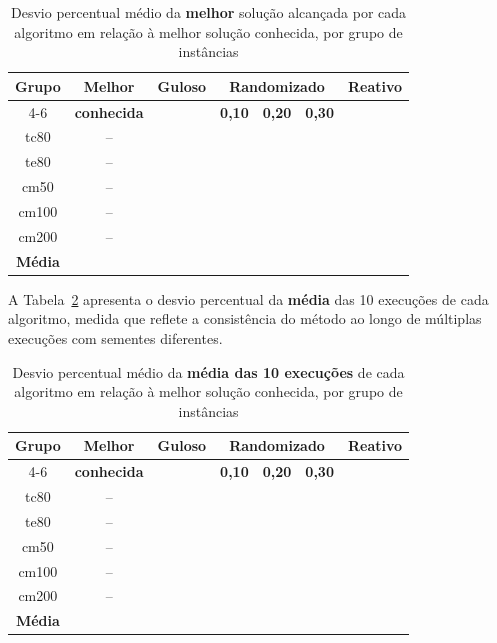 \documentclass[12pt]{article}
\begin{document}
\begin{table}[htbp]
\centering
\caption{Desvio percentual médio da \textbf{melhor} solução alcançada por cada algoritmo em relação à melhor solução conhecida, por grupo de instâncias}
\renewcommand{\arraystretch}{1.2}
{
\footnotesize
\begin{tabular}{|c|c|c|c|c|c|c|}
\hline
\textbf{Grupo} & \textbf{Melhor} & \textbf{Guloso} & \multicolumn{3}{c|}{\textbf{Randomizado}} & \textbf{Reativo} \\ \cline{4-6}
 & \textbf{conhecida} & & \multicolumn{1}{c|}{\textbf{0,10}} & \multicolumn{1}{c|}{\textbf{0,20}} & \multicolumn{1}{c|}{\textbf{0,30}} & \\
\hline
tc80  & -- &  &  &  &  &  \\
te80  & -- &  &  &  &  &  \\
cm50  & -- &  &  &  &  &  \\
cm100 & -- &  &  &  &  &  \\
cm200 & -- &  &  &  &  &  \\
\hline
\textbf{Média} &  &  &  &  &  &  \\
\hline
\end{tabular}
}
\label{tabResultMelhor}
\end{table}

A Tabela~\ref{tabResultMedia} apresenta o desvio percentual da \textbf{média} das 10 execuções de cada algoritmo, medida que reflete a consistência do método ao longo de múltiplas execuções com sementes diferentes.

\begin{table}[htbp]
\centering
\caption{Desvio percentual médio da \textbf{média das 10 execuções} de cada algoritmo em relação à melhor solução conhecida, por grupo de instâncias}
\renewcommand{\arraystretch}{1.2}
{
\footnotesize
\begin{tabular}{|c|c|c|c|c|c|c|}
\hline
\textbf{Grupo} & \textbf{Melhor} & \textbf{Guloso} & \multicolumn{3}{c|}{\textbf{Randomizado}} & \textbf{Reativo} \\ \cline{4-6}
 & \textbf{conhecida} & & \multicolumn{1}{c|}{\textbf{0,10}} & \multicolumn{1}{c|}{\textbf{0,20}} & \multicolumn{1}{c|}{\textbf{0,30}} & \\
\hline
tc80  & -- &  &  &  &  &  \\
te80  & -- &  &  &  &  &  \\
cm50  & -- &  &  &  &  &  \\
cm100 & -- &  &  &  &  &  \\
cm200 & -- &  &  &  &  &  \\
\hline
\textbf{Média} &  &  &  &  &  &  \\
\hline
\end{tabular}
}
\label{tabResultMedia}
\end{table}
\end{document}
